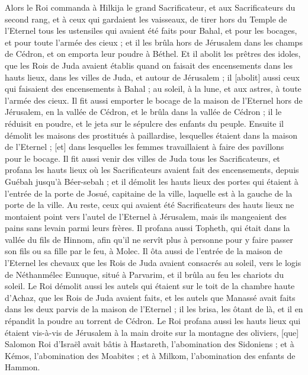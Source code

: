 \begin{multicols}{2}
Alors le Roi commanda à Hilkija le grand Sacrificateur, et aux Sacrificateurs du second rang, et à ceux qui gardaient les vaisseaux, de tirer hors du Temple de l'Eternel tous les ustensiles qui avaient été faits pour Bahal, et pour les bocages, et pour toute l'armée des cieux ; et il les brûla hors de Jérusalem dans les champs de Cédron, et on emporta leur poudre à Béthel.
Et il abolit les prêtres des idoles, que les Rois de Juda avaient établis quand on faisait des encensements dans les hauts lieux, dans les villes de Juda, et autour de Jérusalem ; il [abolit] aussi ceux qui faisaient des encensements à Bahal ; au soleil, à la lune, et aux astres, à toute l'armée des cieux.
Il fit aussi emporter le bocage de la maison de l'Eternel hors de Jérusalem, en la vallée de Cédron, et le brûla dans la vallée de Cédron ; il le réduisit en poudre, et le jeta sur le sépulcre des enfants du peuple.
Ensuite il démolit les maisons des prostitués à paillardise, lesquelles étaient dans la maison de l'Eternel ; [et] dans lesquelles les femmes travaillaient à faire des pavillons pour le bocage.
Il fit aussi venir des villes de Juda tous les Sacrificateurs, et profana les hauts lieux où les Sacrificateurs avaient fait des encensements, depuis Guébah jusqu'à Béer-sebah ; et il démolit les hauts lieux des portes qui étaient à l'entrée de la porte de Josué, capitaine de la ville, laquelle est à la gauche de la porte de la ville.
Au reste, ceux qui avaient été Sacrificateurs des hauts lieux ne montaient point vers l'autel de l'Eternel à Jérusalem, mais ils mangeaient des pains sans levain parmi leurs frères.
Il profana aussi Topheth, qui était dans la vallée du fils de Hinnom, afin qu'il ne servît plus à personne pour y faire passer son fils ou sa fille par le feu, à Molec.
Il ôta aussi de l'entrée de la maison de l'Eternel les chevaux que les Rois de Juda avaient consacrés au soleil, vers le logis de Néthanmélec Eunuque, situé à Parvarim, et il brûla au feu les chariots du soleil.
Le Roi démolit aussi les autels qui étaient sur le toit de la chambre haute d'Achaz, que les Rois de Juda avaient faits, et les autels que Manassé avait faits dans les deux parvis de la maison de l'Eternel ; il les brisa, les ôtant de là, et il en répandit la poudre au torrent de Cédron.
Le Roi profana aussi les hauts lieux qui étaient vis-à-vis de Jérusalem à la main droite sur la montagne des oliviers, [que] Salomon Roi d'Israël avait bâtis à Hastareth, l'abomination des Sidoniens ; et à Kémos, l'abomination des Moabites ; et à Milkom, l'abomination des enfants de Hammon.

\end{multicols}
